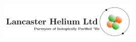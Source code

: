 \documentclass[
	openany, %
	parskip=full, %
	12pt, %
	a4paper, %
]{conferencebooklet} %
\begin{document}
\begin{center}
	\includegraphics[width=0.5\textwidth]{images/logos/Partnerlogos/LancasterHelium.jpg}
\end{center}

\vfill


\newpage

\thispagestyle{empty} %
\pagecolor{myblue} %
~

\end{document}
